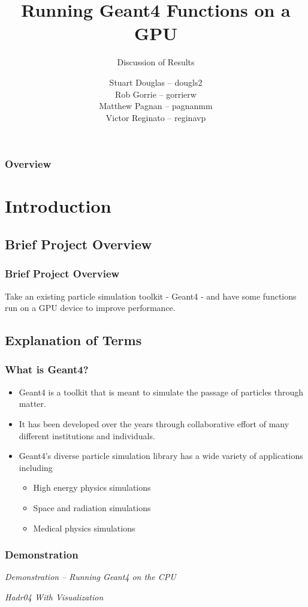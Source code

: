 \documentclass{beamer}
\title[Geant4-GPU (McMaster University)]{Running Geant4 Functions on a GPU}
\subtitle{Discussion of Results}
\institute{McMaster University}
\author[S. Douglas, R. Gorrie, M .Pagnan, V. Reginato]{
Stuart Douglas -- dougls2
\\Rob Gorrie -- gorrierw
\\Matthew Pagnan -- pagnanmm
\\Victor Reginato -- reginavp
}
\begin{document}
\frame{\titlepage}
\begin{frame}
\frametitle{Overview}
\tableofcontents
\end{frame}

\section{Introduction} 

\subsection{Brief Project Overview}
\begin{frame}
\frametitle{Brief Project Overview}
Take an existing particle simulation toolkit - Geant4 - and have some functions run on a GPU device to improve performance.
\end{frame}

\subsection{Explanation of Terms}
\begin{frame}
\frametitle{What is Geant4?}
\begin{itemize}
\item Geant4 is a toolkit that is meant to simulate the passage of particles through matter. 
\item It has been developed over the years through collaborative effort of many different institutions and individuals. 
\item Geant4's diverse particle simulation library has a wide variety of applications including
\begin{itemize}
\item High energy physics simulations
\item Space and radiation simulations
\item Medical physics simulations
\end{itemize}
\end{itemize}
\end{frame}

\begin{frame}
\frametitle{Demonstration}
\begin{center}
\emph{Demonstration -- Running Geant4 on the CPU}

\emph{Hadr04 With Visualization}
\end{center}
\end{frame}
\end{document}

